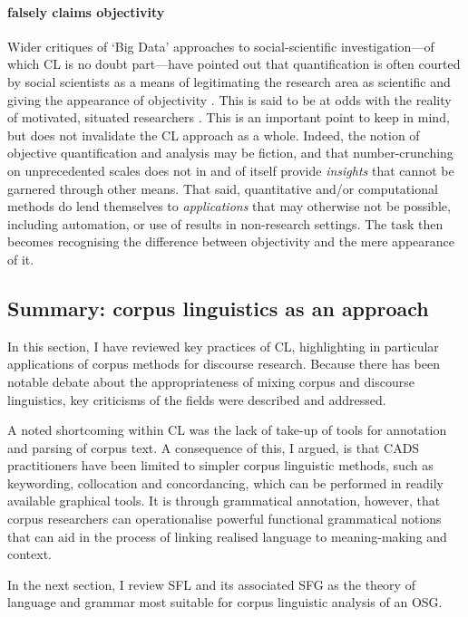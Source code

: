 
\paragraph{ falsely claims objectivity}

Wider critiques of `Big Data' approaches to social\hyp{}scientific investigation---of which \gls{CL} is no doubt part---have pointed out that quantification is often courted by social scientists as a means of legitimating the research area as scientific and giving the appearance of objectivity \cite{boyd_critical_2012,latour_tardes_2010}. This is said to be at odds with the reality of motivated, situated researchers \cite{gitelman_raw_2013}. This is an important point to keep in mind, but does not invalidate the \gls{CL} approach as a whole. Indeed, the notion of objective quantification and analysis may be fiction, and that number\hyp{}crunching on unprecedented scales does not in and of itself provide \emph{insights} that cannot be garnered through other means. That said, quantitative and\slash or computational methods do lend themselves to \emph{applications} that may otherwise not be possible, including automation, or use of results in non-research settings. The task then becomes recognising the difference between objectivity and the mere appearance of it.

\subsection{Summary: corpus linguistics as an approach}

In this section, I have reviewed key practices of \gls{CL}, highlighting in particular applications of corpus methods for discourse research. Because there has been notable debate about the appropriateness of mixing corpus and discourse linguistics, key criticisms of the fields were described and addressed.

A noted shortcoming within \gls{CL} was the lack of take-up of tools for annotation and parsing of corpus text. A consequence of this, I argued, is that \gls{CADS} practitioners have been limited to simpler corpus linguistic methods, such as keywording, collocation and concordancing, which can be performed in readily available graphical tools. It is through grammatical annotation, however, that corpus researchers can operationalise powerful functional grammatical notions that can aid in the process of linking realised language to meaning-making and context. 

In the next section, I review \gls{SFL} and its associated \gls{SFG} as the theory of language and grammar most suitable for corpus linguistic analysis of an \gls{OSG}.
